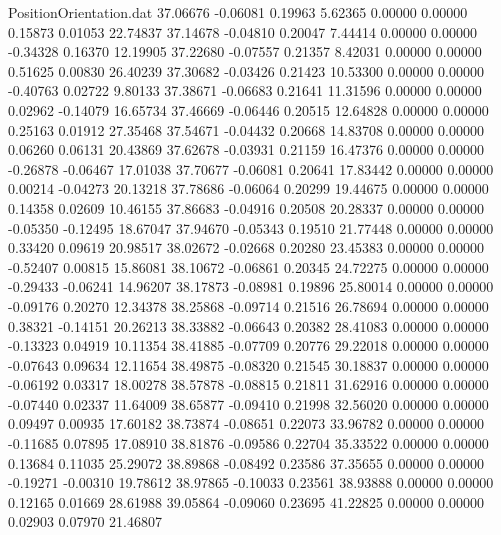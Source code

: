 \begin{filecontents}{PositionOrientation.dat}
  37.06676   -0.06081    0.19963     5.62365    0.00000    0.00000    0.15873    0.01053   22.74837
  37.14678   -0.04810    0.20047     7.44414    0.00000    0.00000   -0.34328    0.16370   12.19905
  37.22680   -0.07557    0.21357     8.42031    0.00000    0.00000    0.51625    0.00830   26.40239
  37.30682   -0.03426    0.21423    10.53300    0.00000    0.00000   -0.40763    0.02722    9.80133
  37.38671   -0.06683    0.21641    11.31596    0.00000    0.00000    0.02962   -0.14079   16.65734
  37.46669   -0.06446    0.20515    12.64828    0.00000    0.00000    0.25163    0.01912   27.35468
  37.54671   -0.04432    0.20668    14.83708    0.00000    0.00000    0.06260    0.06131   20.43869
  37.62678   -0.03931    0.21159    16.47376    0.00000    0.00000   -0.26878   -0.06467   17.01038
  37.70677   -0.06081    0.20641    17.83442    0.00000    0.00000    0.00214   -0.04273   20.13218
  37.78686   -0.06064    0.20299    19.44675    0.00000    0.00000    0.14358    0.02609   10.46155
  37.86683   -0.04916    0.20508    20.28337    0.00000    0.00000   -0.05350   -0.12495   18.67047
  37.94670   -0.05343    0.19510    21.77448    0.00000    0.00000    0.33420    0.09619   20.98517
  38.02672   -0.02668    0.20280    23.45383    0.00000    0.00000   -0.52407    0.00815   15.86081
  38.10672   -0.06861    0.20345    24.72275    0.00000    0.00000   -0.29433   -0.06241   14.96207
  38.17873   -0.08981    0.19896    25.80014    0.00000    0.00000   -0.09176    0.20270   12.34378
  38.25868   -0.09714    0.21516    26.78694    0.00000    0.00000    0.38321   -0.14151   20.26213
  38.33882   -0.06643    0.20382    28.41083    0.00000    0.00000   -0.13323    0.04919   10.11354
  38.41885   -0.07709    0.20776    29.22018    0.00000    0.00000   -0.07643    0.09634   12.11654
  38.49875   -0.08320    0.21545    30.18837    0.00000    0.00000   -0.06192    0.03317   18.00278
  38.57878   -0.08815    0.21811    31.62916    0.00000    0.00000   -0.07440    0.02337   11.64009
  38.65877   -0.09410    0.21998    32.56020    0.00000    0.00000    0.09497    0.00935   17.60182
  38.73874   -0.08651    0.22073    33.96782    0.00000    0.00000   -0.11685    0.07895   17.08910
  38.81876   -0.09586    0.22704    35.33522    0.00000    0.00000    0.13684    0.11035   25.29072
  38.89868   -0.08492    0.23586    37.35655    0.00000    0.00000   -0.19271   -0.00310   19.78612
  38.97865   -0.10033    0.23561    38.93888    0.00000    0.00000    0.12165    0.01669   28.61988
  39.05864   -0.09060    0.23695    41.22825    0.00000    0.00000    0.02903    0.07970   21.46807

\end{filecontents}
